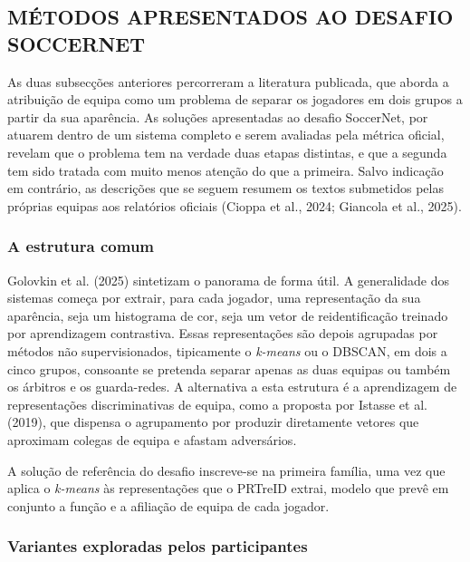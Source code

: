 
\subsection{MÉTODOS APRESENTADOS AO DESAFIO SOCCERNET}
\label{sec:equipa_desafio}

As duas subsecções anteriores percorreram a literatura publicada, que aborda a
atribuição de equipa como um problema de separar os jogadores em dois grupos a partir
da sua aparência. As soluções apresentadas ao desafio SoccerNet, por atuarem dentro de
um sistema completo e serem avaliadas pela métrica oficial, revelam que o problema tem
na verdade duas etapas distintas, e que a segunda tem sido tratada com muito menos
atenção do que a primeira. Salvo indicação em contrário, as descrições que se seguem
resumem os textos submetidos pelas próprias equipas aos relatórios oficiais (Cioppa
et al., 2024; Giancola et al., 2025).

\subsubsection*{A estrutura comum}

Golovkin et al. (2025) sintetizam o panorama de forma útil. A generalidade dos sistemas
começa por extrair, para cada jogador, uma representação da sua aparência, seja um
histograma de cor, seja um vetor de reidentificação treinado por aprendizagem
contrastiva. Essas representações são depois agrupadas por métodos não supervisionados,
tipicamente o \emph{k-means} ou o DBSCAN, em dois a cinco grupos, consoante se
pretenda separar apenas as duas equipas ou também os árbitros e os guarda-redes. A
alternativa a esta estrutura é a aprendizagem de representações discriminativas de
equipa, como a proposta por Istasse et al. (2019), que dispensa o agrupamento por
produzir diretamente vetores que aproximam colegas de equipa e afastam adversários.

A solução de referência do desafio inscreve-se na primeira família, uma vez que aplica
o \emph{k-means} às representações que o PRTreID extrai, modelo que prevê em conjunto a
função e a afiliação de equipa de cada jogador.

\subsubsection*{Variantes exploradas pelos participantes}

